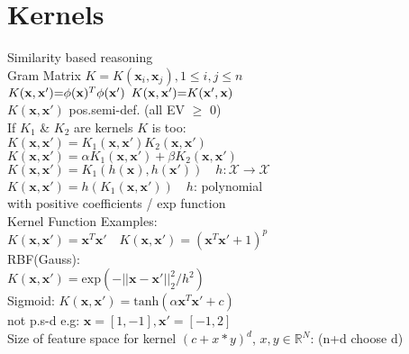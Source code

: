\section*{Kernels}
Similarity based reasoning\\
Gram Matrix $K{=}K(\mathbf{x}_i, \mathbf{x}_j), 1{\leq} i,j{\leq} n$\\
$K(\mathbf{x}, \mathbf{x'}) {=} \phi(\mathbf{x})^T\phi(\mathbf{x'}) \enskip K(\mathbf{x},\mathbf{x'}){=}K(\mathbf{x'},\mathbf{x})$\\
$K(\mathbf{x},\mathbf{x'})$ pos.semi-def. (all EV $\geq$ 0)\\
If $K_1$ \& $K_2$ are kernels $K$ is too:\\
$K(\mathbf{x}, \mathbf{x'})=K_1(\mathbf{x}, \mathbf{x'})K_2(\mathbf{x}, \mathbf{x'})$\\
$K(\mathbf{x},\mathbf{x'})=\alpha K_1(\mathbf{x}, \mathbf{x'})+\beta K_2(\mathbf{x}, \mathbf{x'})$\\
$K(\mathbf{x},\mathbf{x'}){=}K_1(h(\mathbf{x}), h(\mathbf{x'}))\quad h:\mathcal{X}{\rightarrow}\mathcal{X}$\\
$K(\mathbf{x},\mathbf{x'}){=}h(K_1(\mathbf{x}, \mathbf{x'}))\quad h$: polynomial \\
with positive coefficients / exp function\\
Kernel Function Examples:\\
$K(\mathbf{x},\mathbf{x'}){=}\mathbf{x}^T\mathbf{x'}\quad K(\mathbf{x},\mathbf{x'}){=}(\mathbf{x}^T\mathbf{x'}{+}1)^p$\\
RBF(Gauss):\\
$K(\mathbf{x},\mathbf{x'}){=}\mathrm{exp}(-||\mathbf{x}{-}\mathbf{x'}||_2^2/h^2)$\\
Sigmoid: $K(\mathbf{x},\mathbf{x'}){=}\mathrm{tanh}(\alpha\mathbf{x}^T\mathbf{x'}+c)$\\
not p.s-d e.g: $\mathbf{x}{=}[1,-1], \mathbf{x'}{=}[-1,2]$ \\
Size of feature space for kernel $(c+x*y)^d$, $x,y \in \mathbb{R}^N$: (n+d choose d)